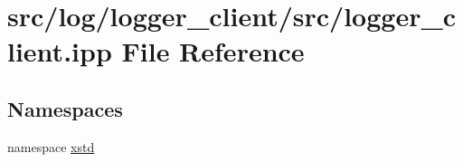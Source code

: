 \hypertarget{logger__client_8ipp}{\section{src/log/logger\-\_\-client/src/logger\-\_\-client.ipp File Reference}
\label{logger__client_8ipp}
}
\subsection*{Namespaces}
\begin{DoxyCompactItemize}
\item 
namespace \hyperlink{namespacexstd}{xstd}
\end{DoxyCompactItemize}
